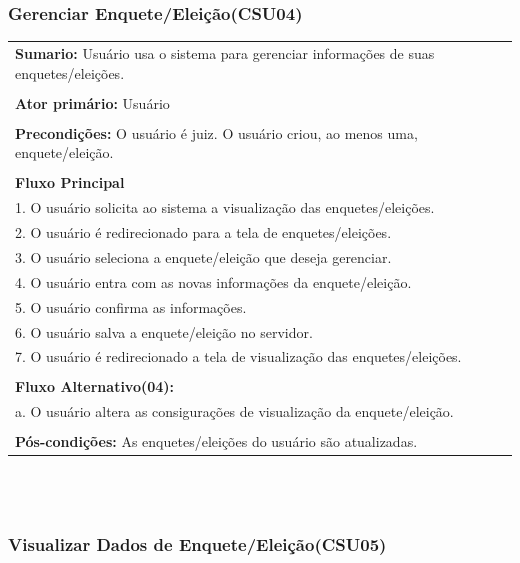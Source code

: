 \documentclass[a4paper,12pt]{article}
\begin{document}
\begin{center}
	{\subsubsection*{Gerenciar Enquete/Eleição(CSU04)}}
\end{center}
\markright{}
\begin{tabular}{|l|}\hline
	{\textbf{Sumario:}} Usuário usa o sistema para gerenciar informações de suas enquetes/eleições.\ \ \ \ \ \ \ \ \ \\\\
	{\textbf{Ator primário:}} Usuário \\\\
	{\textbf{Precondições:}} O usuário é juiz. O usuário criou, ao menos uma, enquete/eleição.\\\\
	{\textbf{Fluxo Principal}}\\
	1. O usuário solicita ao sistema a visualização das enquetes/eleições.\\
	2. O usuário é redirecionado para a tela de enquetes/eleições. \\
	3. O usuário seleciona a enquete/eleição que deseja gerenciar. \\
	4. O usuário entra com as novas informações da enquete/eleição.\\
	5. O usuário confirma as informações.\\
	6. O usuário salva a enquete/eleição no servidor.\\
	7. O usuário é redirecionado a tela de visualização das enquetes/eleições.\\\\
	{\textbf{Fluxo Alternativo(04):}}\\
	a. O usuário altera as consigurações de visualização da enquete/eleição.\\\\
	{\textbf{Pós-condições:}} As enquetes/eleições do usuário são atualizadas.\\
	\hline
\end{tabular}
\\\\
\begin{center}
	{\subsubsection*{Visualizar Dados de Enquete/Eleição(CSU05)}}
\end{center}
\end{document}
